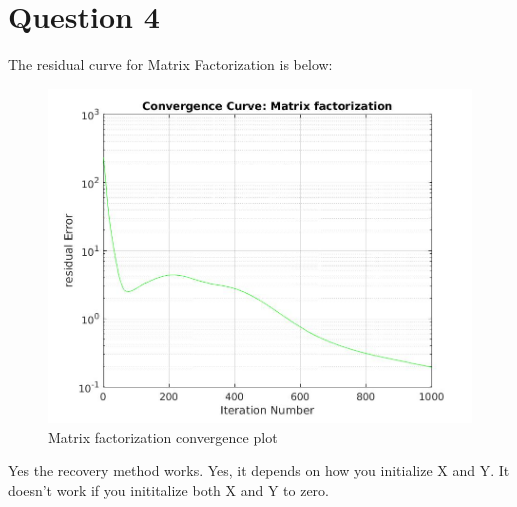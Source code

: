 \documentclass{article}
\begin{document}
\section*{Question 4}

The residual curve for Matrix Factorization is below:

\begin{figure}[H]
\centering
\includegraphics[width=1\linewidth]{MatrixFactorization_residual.jpg}
\caption{Matrix factorization convergence plot}
\end{figure}

Yes the recovery method works. Yes, it depends on how you initialize X and Y. It doesn't work if you inititalize both X and Y to zero.
\end{document}
